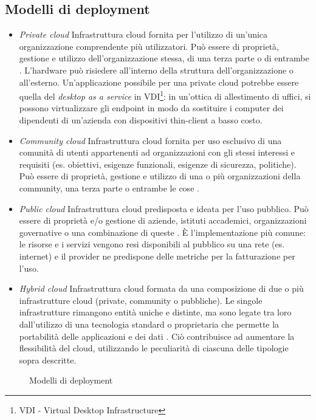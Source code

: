 \documentclass[../main.tex]{subfiles}
\begin{document}
\subsection{Modelli di deployment}
\begin{itemize}
\item \textit{Private cloud}
Infrastruttura cloud fornita per l'utilizzo di un'unica organizzazione comprendente più utilizzatori. Può essere di proprietà, gestione e utilizzo dell'organizzazione stessa, di una terza parte o di entrambe \cite{NISTCloud}.
L'hardware può risiedere all'interno della struttura dell'organizzazione o all'esterno.
Un'applicazione possibile per una private cloud potrebbe essere quella del \textit{desktop as a service} in VDI\footnote{VDI - Virtual Desktop Infrastructure}: in un'ottica di allestimento di uffici, si possono virtualizzare gli endpoint in modo da sostituire i computer dei dipendenti di un'azienda con dispositivi thin-client a basso costo.
\item \textit{Community cloud}
Infrastruttura cloud fornita per uso esclusivo di una comunità di utenti appartenenti ad organizzazioni con gli stessi interessi e requisiti (es. obiettivi, esigenze funzionali, esigenze di sicurezza, politiche). Può essere di proprietà, gestione e utilizzo di una o più organizzazioni della community, una terza parte o entrambe le cose \cite{NISTCloud}.
\item \textit{Public cloud}
Infrastruttura cloud predisposta e ideata per l'uso pubblico. Può essere di proprietà e/o gestione di aziende, istituti accademici, organizzazioni governative o una combinazione di queste \cite{NISTCloud}.
\`E l'implementazione più comune: le risorse e i servizi vengono resi disponibili al pubblico su una rete (es. internet) e il provider ne predispone delle metriche per la fatturazione per l'uso.
\item \textit{Hybrid cloud}
Infrastruttura cloud formata da una composizione di due o più infrastrutture cloud (private, community o pubbliche). Le singole infrastrutture rimangono entità uniche e distinte, ma sono legate tra loro dall'utilizzo di una tecnologia standard o proprietaria che permette la portabilità delle applicazioni e dei dati \cite{NISTCloud}. Ciò contribuisce ad aumentare la flessibilità del cloud, utilizzando le peculiarità di ciascuna delle tipologie sopra descritte.
\end{itemize}
\begin{figure}[H]
\centering
{}
\caption{Modelli di deployment}\label{fig:modellideployment}
\end{figure}
\end{document}
